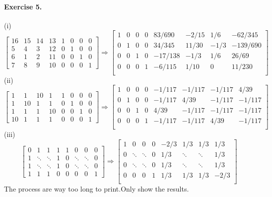 \documentclass{article}
\begin{document}
\paragraph{Exercise 5.}
(i)\[
\begin{bmatrix}
    16 & 15 & 14 & 13 & 1 & 0 & 0 & 0\\
    5 & 4 & 3 & 12 & 0 & 1 & 0 & 0\\
    6 & 1 & 2 & 11 & 0 & 0 & 1 & 0\\
    7 & 8 & 9 & 10 & 0 & 0 & 0 & 1
\end{bmatrix} \Rightarrow \begin{bmatrix}
     1 & 0 & 0 & 0&83/690&-2/15&1/6&-62/345\\
     0 & 1 & 0 & 0&34/345&11/30&-1/3&-139/690\\
     0 & 0 & 1 & 0&-17/138&-1/3&1/6&26/69\\
     0 & 0 & 0 & 1&-6/115&1/10&0&11/230\\
\end{bmatrix}
\]
(ii)
\[
    \begin{bmatrix}
        1 & 1 & 10 & 1 & 1 & 0 & 0 & 0\\
        1 & 10 & 1 & 1 & 0 & 1 & 0 & 0\\
        1 & 1 & 1 & 10 & 0 & 0 & 1 & 0\\
        10 & 1 & 1 & 1 & 0 & 0 & 0 & 1
    \end{bmatrix} \Rightarrow \begin{bmatrix}
         1 & 0 & 0 & 0&-1/117&-1/117&-1/117&4/39\\
         0 & 1 & 0 & 0&-1/117&4/39&-1/117&-1/117\\
         0 & 0 & 1 & 0&	4/39&-1/117&-1/117&-1/117\\
         0 & 0 & 0 & 1&-1/117&-1/117&4/39&-1/117\\
    \end{bmatrix}
\]
(iii)\[
    \begin{bmatrix}
        0 & 1 & 1 & 1 & 1 & 0 & 0 & 0\\
        1 & \ddots & \ddots & 1 & 0 & \ddots & \ddots & 0\\
        1 & \ddots & \ddots & 1 & 0 & \ddots & \ddots & 0\\
        1 & 1 & 1 & 0 & 0 & 0 & 0 & 1
    \end{bmatrix} \Rightarrow \begin{bmatrix}
         1 & 0 & 0 & 0&-2/3&1/3&1/3&1/3\\
         0 & \ddots & \ddots & 0&1/3& \ddots & \ddots&1/3\\
         0 & \ddots & \ddots & 0&1/3& \ddots & \ddots&1/3\\
         0 & 0 & 0 & 1&1/3&1/3&1/3&-2/3\\
    \end{bmatrix}
\]
The process are way too long to print.Only show the results.
\end{document}
